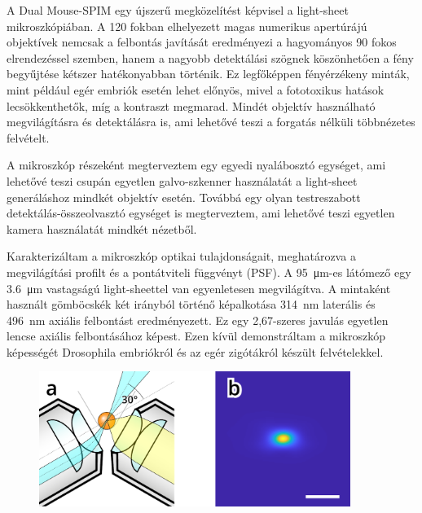 \documentclass{booklet_style}
\begin{document}
    A Dual Mouse-SPIM egy újszerű megközelítést képvisel a light-sheet mikroszkópiában. A 120 fokban elhelyezett magas numerikus apertúrájú objektívek nemcsak a felbontás javítását eredményezi a hagyományos 90 fokos elrendezéssel szemben, hanem a nagyobb detektálási szögnek köszönhetően a fény begyűjtése kétszer hatékonyabban történik. Ez legfőképpen fényérzékeny minták, mint például egér embriók esetén lehet előnyös, mivel a fototoxikus hatások lecsökkenthetők, míg a kontraszt megmarad. Mindét objektív használható megvilágításra és detektálásra is, ami lehetővé teszi a forgatás nélküli többnézetes felvételt.

    A mikroszkóp részeként megterveztem egy egyedi nyalábosztó egységet, ami lehetővé teszi csupán egyetlen galvo-szkenner használatát a light-sheet generáláshoz mindkét objektív esetén. Továbbá egy olyan testreszabott detektálás-összeolvasztó egységet is megterveztem, ami lehetővé teszi egyetlen kamera használatát mindkét nézetből.

    Karakterizáltam a mikroszkóp optikai tulajdonságait, meghatározva a megvilágítási profilt és a pontátviteli függvényt (PSF).
    A \SI{95}{\micro m}-es látómező egy \SI{3,6}{\micro m} vastagságú light-sheettel van egyenletesen megvilágítva. A mintaként használt gömböcskék két irányból történő képalkotása \SI{314}{nm} laterális és \SI{496}{nm} axiális felbontást eredményezett. Ez egy 2,67-szeres javulás egyetlen lencse axiális felbontásához képest. Ezen kívül demonstráltam a  mikroszkóp képességét Drosophila embriókról és az egér zigótákról készült felvételekkel. 
    

    \begin{figure}
      \centering
      \includegraphics[width=0.9\textwidth]{2_DualMouse/120+psf}
      \label{fig:DualMouse}
    \end{figure}
\end{document}
